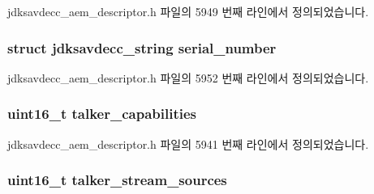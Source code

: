 jdksavdecc\+\_\+aem\+\_\+descriptor.\+h 파일의 5949 번째 라인에서 정의되었습니다.

\subsubsection[{\texorpdfstring{serial\+\_\+number}{serial_number}}]{\setlength{\rightskip}{0pt plus 5cm}struct {\bf jdksavdecc\+\_\+string} serial\+\_\+number}\hypertarget{structjdksavdecc__descriptor__entity_a3cf7494988985903d75b67aef67976d5}{}\label{structjdksavdecc__descriptor__entity_a3cf7494988985903d75b67aef67976d5}


jdksavdecc\+\_\+aem\+\_\+descriptor.\+h 파일의 5952 번째 라인에서 정의되었습니다.

\subsubsection[{\texorpdfstring{talker\+\_\+capabilities}{talker_capabilities}}]{\setlength{\rightskip}{0pt plus 5cm}uint16\+\_\+t talker\+\_\+capabilities}\hypertarget{structjdksavdecc__descriptor__entity_a51f25c5187ed3f58d17c11e1dc0f3352}{}\label{structjdksavdecc__descriptor__entity_a51f25c5187ed3f58d17c11e1dc0f3352}


jdksavdecc\+\_\+aem\+\_\+descriptor.\+h 파일의 5941 번째 라인에서 정의되었습니다.

\subsubsection[{\texorpdfstring{talker\+\_\+stream\+\_\+sources}{talker_stream_sources}}]{\setlength{\rightskip}{0pt plus 5cm}uint16\+\_\+t talker\+\_\+stream\+\_\+sources}\hypertarget{structjdksavdecc__descriptor__entity_a9bd7d7b8ebd60d782a8b2be740355a37}{}\label{structjdksavdecc__descriptor__entity_a9bd7d7b8ebd60d782a8b2be740355a37}


